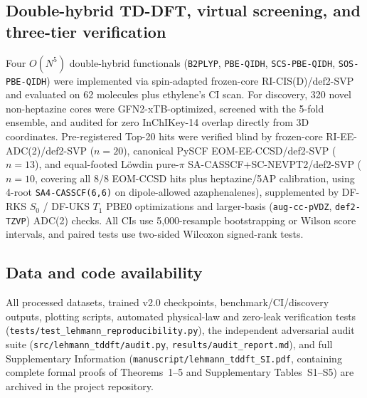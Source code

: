 \documentclass[10pt,twocolumn]{article}
\theoremstyle{natthm}
\begin{document}
\subsection*{Double-hybrid TD-DFT, virtual screening, and three-tier verification}
Four $O(N^5)$ double-hybrid functionals (\texttt{B2PLYP}, \texttt{PBE-QIDH}, \texttt{SCS-PBE-QIDH}, \texttt{SOS-PBE-QIDH}\cite{grimme2007,casanovapaez2021}) were implemented via spin-adapted frozen-core RI-CIS(D)/def2-SVP and evaluated on 62 molecules plus ethylene's CI scan.
For discovery, 320 novel non-heptazine cores were GFN2-xTB-optimized\cite{bannwarth2019xtb}, screened with the 5-fold ensemble, and audited for zero InChIKey-14 overlap directly from 3D coordinates.
Pre-registered Top-20 hits were verified blind by frozen-core RI-EE-ADC(2)/def2-SVP\cite{dreuw2015adc} ($n=20$), canonical PySCF EOM-EE-CCSD/def2-SVP\cite{stanton1993eom} ($n=13$), and equal-footed L\"owdin pure-$\pi$ SA-CASSCF+SC-NEVPT2/def2-SVP ($n=10$, covering all $8/8$ EOM-CCSD hits plus heptazine/5AP calibration, using 4-root \texttt{SA4-CASSCF(6,6)} on dipole-allowed azaphenalenes), supplemented by DF-RKS $S_0$ / DF-UKS $T_1$ PBE0 optimizations\cite{wang2016geometric} and larger-basis (\texttt{aug-cc-pVDZ}, \texttt{def2-TZVP}) ADC(2) checks.
All CIs use 5,000-resample bootstrapping\cite{efron1979} or Wilson score intervals\cite{wilson1927}, and paired tests use two-sided Wilcoxon signed-rank tests\cite{wilcoxon1945}.

\subsection*{Data and code availability}
All processed datasets, trained v2.0 checkpoints, benchmark/CI/discovery outputs, plotting scripts, automated physical-law and zero-leak verification tests (\texttt{tests/test\_lehmann\_reproducibility.py}), the independent adversarial audit suite (\texttt{src/lehmann\_tddft/audit.py}, \texttt{results/audit\_report.md}), and full Supplementary Information (\texttt{manuscript/lehmann\_tddft\_SI.pdf}, containing complete formal proofs of Theorems~1--5 and Supplementary Tables~S1--S5) are archived in the project repository.
\end{document}
